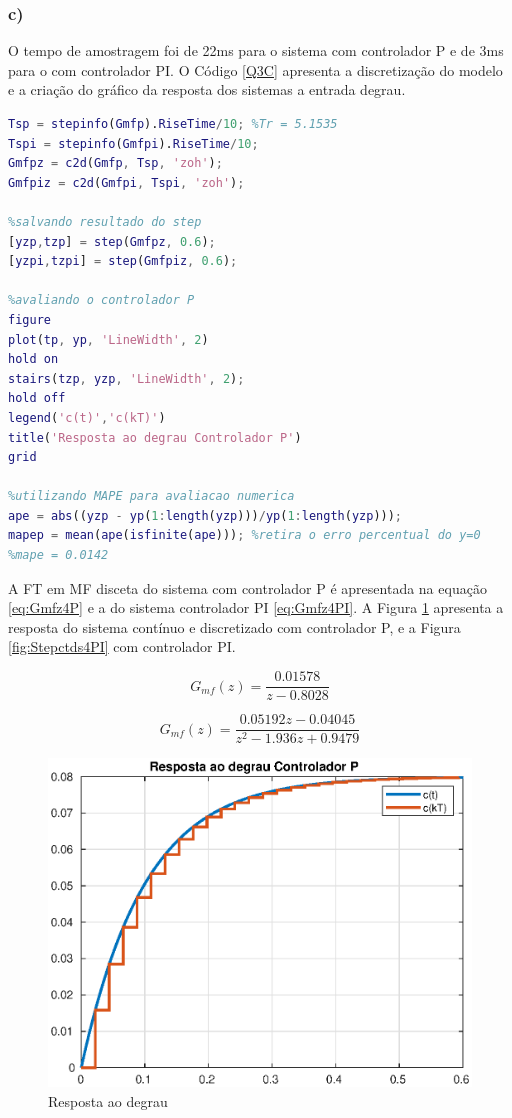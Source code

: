 \clearpage 
\newpage
\subsubsection*{c)}
    O tempo de amostragem foi de 22ms para o sistema com controlador P e de 3ms para o com controlador PI.
    O Código \ref{Q3C} apresenta a discretização do modelo e a criação do gráfico da resposta dos sistemas 
    a entrada degrau.

\begin{lstlisting}[language=Matlab,label=Q4C,caption= Análise da estabilidade]
Tsp = stepinfo(Gmfp).RiseTime/10; %Tr = 5.1535
Tspi = stepinfo(Gmfpi).RiseTime/10;
Gmfpz = c2d(Gmfp, Tsp, 'zoh');
Gmfpiz = c2d(Gmfpi, Tspi, 'zoh');

%salvando resultado do step
[yzp,tzp] = step(Gmfpz, 0.6); 
[yzpi,tzpi] = step(Gmfpiz, 0.6);

%avaliando o controlador P
figure 
plot(tp, yp, 'LineWidth', 2)
hold on
stairs(tzp, yzp, 'LineWidth', 2);
hold off
legend('c(t)','c(kT)')
title('Resposta ao degrau Controlador P')
grid

%utilizando MAPE para avaliacao numerica
ape = abs((yzp - yp(1:length(yzp)))/yp(1:length(yzp))); 
mapep = mean(ape(isfinite(ape))); %retira o erro percentual do y=0
%mape = 0.0142
\end{lstlisting}

A FT em MF disceta do sistema com controlador P é apresentada na equação \ref{eq:Gmfz4P} e a do sistema controlador PI \ref{eq:Gmfz4PI}.
A Figura \ref{fig:Stepctds4P} apresenta a resposta do sistema contínuo e discretizado com controlador P, e a Figura \ref{fig:Stepctds4PI}
com controlador PI.

\begin{equation}
    G_{mf}(z) = \frac{0.01578}{z - 0.8028}
    \label{eq:Gmfz4P}
\end{equation}

\begin{equation}
    G_{mf}(z) = \frac{0.05192 z - 0.04045}{z^2 - 1.936 z + 0.9479}
    \label{eq:Gmfz4PI}
\end{equation}

\begin{figure}[!ht]
    \centering
    \includegraphics[width = 0.75\linewidth]{Figuras/ProblemasPI/Problema4/stepPz.eps}
    \caption{Resposta ao degrau}
    \label{fig:Stepctds4P}                   
\end{figure}

